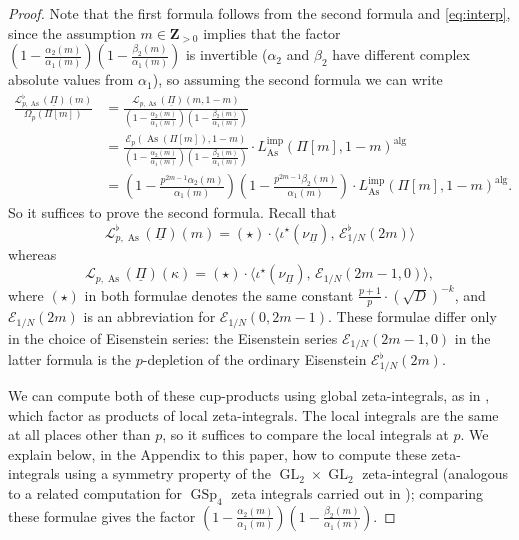 \documentclass[a4paper,10pt]{amsart}
\theoremstyle{plain}
\theoremstyle{remark}
\DeclareMathOperator{\GL}{GL}
\DeclareMathOperator{\GSp}{GSp}
\DeclareMathOperator{\imp}{imp}
\DeclareMathOperator{\alg}{alg}
\DeclareMathOperator{\As}{As}
\newcommand{\ZZ}{\mathbf{Z}}
\newcommand{\cE}{\mathcal{E}}
\newcommand{\cL}{\mathcal{L}}
\newcommand{\uPi}{\underline{\Pi}}
\numberwithin{equation}{section}
\begin{document}
  \begin{proof}
   Note that the first formula follows from the second formula and \eqref{eq:interp}, since the assumption $m \in \ZZ_{>0}$ implies that the factor $ \left(1-\frac{\alpha_2(m)}{\alpha_1(m)}\right)\left(1-\frac{
   \beta_2(m)}{\alpha_1(m)}\right)$ is invertible ($\alpha_2$ and $\beta_2$ have different complex absolute values from $\alpha_1$), so assuming the second formula we can write
   \begin{align*}
    \frac{\cL^\flat_{p,\As}(\uPi)(m)}{\Omega_p(\Pi[m])} &= 
    \frac{\cL_{p,\As}(\uPi)(m, 1 - m)}{\left(1-\frac{\alpha_2(m)}{\alpha_1(m)}\right)\left(1-\frac{
           \beta_2(m)}{\alpha_1(m)}\right)} \\
    &=
    \frac{\cE_p(\As(\Pi[m]), 1 - m)}{\left(1-\frac{\alpha_2(m)}{\alpha_1(m)}\right)\left(1-\frac{
       \beta_2(m)}{\alpha_1(m)}\right)} \cdot L_{\As}^{\imp}(\Pi[m], 1 - m)^{\alg} \\
    &= \left(1 - \tfrac{p^{2m-1} \alpha_2(m)}{\alpha_1(m)}\right)
           \left(1 - \tfrac{p^{2m-1} \beta_2(m)}{\alpha_1(m)}\right)\cdot L_{\As}^{\imp}(\Pi[m], 1 - m)^{\alg}.
   \end{align*}
   So it suffices to prove the second formula. Recall that
   \[  
    \cL^\flat_{p,\As}(\uPi)(m) = (\star) \cdot \Big\langle
    \iota^\star\left(\nu_{\underline{\Pi}}\right),\,
    \cE^{\flat}_{1/N}(2m) \Big\rangle
   \]
   whereas
   \[  
    \cL_{p,\As}(\uPi)(\kappa) = (\star) \cdot \Big\langle
    \iota^\star\left(\nu_{\underline{\Pi}}\right),\, \cE_{1/N}(2m-1, 0)
    \Big\rangle,
   \]
   where $(\star)$ in both formulae denotes the same constant $\tfrac{p + 1}{p} \cdot (\sqrt{D})^{-k}$, and $\cE_{1/N}(2m)$ is an abbreviation for $\cE_{1/N}(0, 2m-1)$. These formulae differ only in the choice of Eisenstein series: the Eisenstein series $\cE_{1/N}(2m-1,0)$ in the latter formula is the $p$-depletion of the ordinary Eisenstein $\cE^\flat_{1/N}(2m)$.
   
   We can compute both of these cup-products using global zeta-integrals, as in \cite{grossiloefflerzerbesLfunct}, which factor as products of local zeta-integrals. The local integrals are the same at all places other than $p$, so it suffices to compare the local integrals at $p$. We explain below, in the Appendix to this paper, how to compute these zeta-integrals using a symmetry property of the $\GL_2 \times \GL_2$ zeta-integral (analogous to a related computation for $\GSp_4$ zeta integrals carried out in \cite[\S 8]{LPSZ1}); comparing these formulae gives the factor $\left(1-\frac{\alpha_2(m)}{\alpha_1(m)}\right)\left(1-\frac{
              \beta_2(m)}{\alpha_1(m)}\right)$.
  \end{proof}
  
\end{document}
